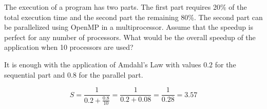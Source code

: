 \begin{acexercise}\end{acexercise}

The execution of a program has two parts. The first part requires 20\% of the
total execution time and the second part the remaining 80\%. The second part can
be parallelized using OpenMP in a multiprocessor. Assume that the speedup is
perfect for any number of processors. What would be the overall speedup of the
application when 10 processors are used?


\begin{acsolution}\end{acsolution}

It is enough with the application of Amdahl's Law with values
$0.2$ for the sequential part and $0.8$ for the parallel part.

\[
S = \frac{1}{0.2 + \frac{0.8}{10}} = \frac{1}{0.2 + 0.08} = \frac{1}{0.28} =
3.57
\]
